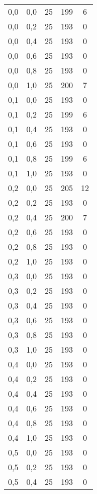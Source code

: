 \begin{center}
\begin{scriptsize}
\begin{longtable}[h]{| c | c | c || c | c |}
			0,0 & 0,0 & 25 & 199 & 6         \\
			0,0 & 0,2 & 25 & 193 & 0         \\
			0,0 & 0,4 & 25 & 193 & 0         \\
			0,0 & 0,6 & 25 & 193 & 0         \\
			0,0 & 0,8 & 25 & 193 & 0         \\
			0,0 & 1,0 & 25 & 200 & 7         \\
			\hline
			0,1 & 0,0 & 25 & 193 & 0         \\
			0,1 & 0,2 & 25 & 199 & 6         \\
			0,1 & 0,4 & 25 & 193 & 0         \\
			0,1 & 0,6 & 25 & 193 & 0         \\
			0,1 & 0,8 & 25 & 199 & 6         \\
			0,1 & 1,0 & 25 & 193 & 0         \\
			\hline
			0,2 & 0,0 & 25 & 205 & 12        \\
			0,2 & 0,2 & 25 & 193 & 0         \\
			0,2 & 0,4 & 25 & 200 & 7         \\
			0,2 & 0,6 & 25 & 193 & 0         \\
			0,2 & 0,8 & 25 & 193 & 0         \\
			0,2 & 1,0 & 25 & 193 & 0         \\
			\hline
			0,3 & 0,0 & 25 & 193 & 0         \\
			0,3 & 0,2 & 25 & 193 & 0         \\
			0,3 & 0,4 & 25 & 193 & 0         \\
			0,3 & 0,6 & 25 & 193 & 0         \\
			0,3 & 0,8 & 25 & 193 & 0         \\
			0,3 & 1,0 & 25 & 193 & 0         \\
			\hline
			0,4 & 0,0 & 25 & 193 & 0         \\
			0,4 & 0,2 & 25 & 193 & 0         \\
			0,4 & 0,4 & 25 & 193 & 0         \\
			0,4 & 0,6 & 25 & 193 & 0         \\
			0,4 & 0,8 & 25 & 193 & 0         \\
			0,4 & 1,0 & 25 & 193 & 0         \\
			\hline
			0,5 & 0,0 & 25 & 193 & 0         \\
			0,5 & 0,2 & 25 & 193 & 0         \\
			0,5 & 0,4 & 25 & 193 & 0         \\

\end{longtable}
\end{scriptsize}
\end{center}
